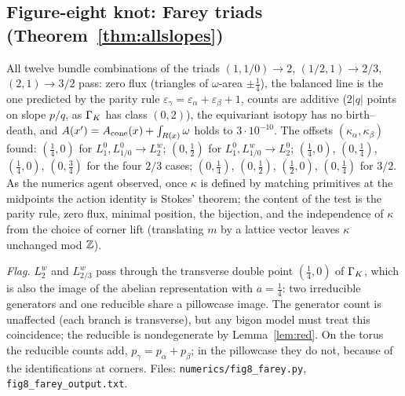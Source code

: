 \subsection{Figure-eight knot: Farey triads (Theorem~\ref{thm:allslopes})}
All twelve bundle combinations of the triads $(1,1/0)\to2$, $(1/2,1)\to2/3$, $(2,1)\to3/2$ pass: zero flux
(triangles of $\omega$-area $\pm\tfrac14$), the balanced line is the one predicted by the parity rule
$\varepsilon_\gamma=\varepsilon_\alpha+\varepsilon_\beta+1$, counts are additive ($2|q|$ points on slope $p/q$, as $\Gamma_K$ has class $(0,2)$),
the equivariant isotopy has no birth--death, and $A(x')=A_{\rm cone}(x)+\int_{R(x)}\omega$ holds to $3\cdot10^{-10}$.
The offsets $(\kappa_\alpha,\kappa_\beta)$ found: $(\tfrac14,0)$ for $L^0_1,L^0_{1/0}\to L^w_2$; $(0,\tfrac12)$ for
$L^0_1,L^w_{1/0}\to L^0_2$; $(\tfrac14,0)$, $(0,\tfrac14)$, $(\tfrac14,0)$, $(0,\tfrac34)$ for the four $2/3$ cases;
$(0,\tfrac14)$, $(0,\tfrac12)$, $(\tfrac12,0)$, $(0,\tfrac14)$ for $3/2$.  As the numerics agent observed, once
$\kappa$ is defined by matching primitives at the midpoints the action identity is Stokes' theorem; the content of the
test is the parity rule, zero flux, minimal position, the bijection, and the independence of $\kappa$ from the
choice of corner lift (translating $m$ by a lattice vector leaves $\kappa$ unchanged mod $\mathbb{Z}$).

\emph{Flag.}  $L^w_2$ and $L^w_{2/3}$ pass through the transverse double point $(\tfrac14,0)$ of $\Gamma_K$, which is also
the image of the abelian representation with $a=\tfrac14$: two irreducible generators and one reducible share a
pillowcase image.  The generator count is unaffected (each branch is transverse), but any bigon model must treat
this coincidence; the reducible is nondegenerate by Lemma~\ref{lem:red}.  On the torus the reducible counts add,
$p_\gamma=p_\alpha+p_\beta$; in the pillowcase they do not, because of the identifications at corners.
Files: \texttt{numerics/fig8\_farey.py}, \texttt{fig8\_farey\_output.txt}.
